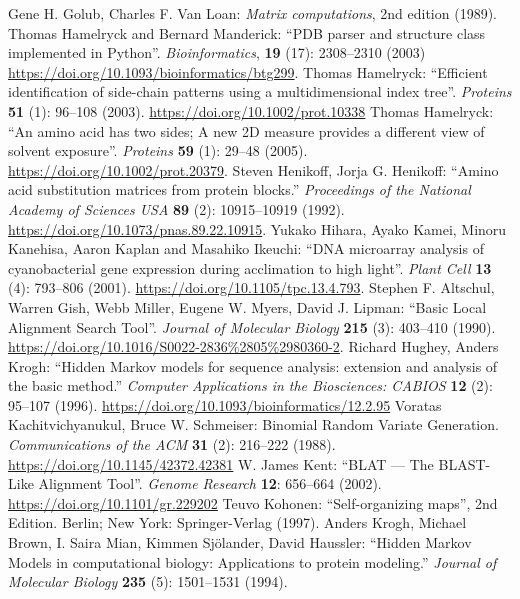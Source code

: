 \documentclass{report}
\begin{document}
\begin{thebibliography}{99}
Gene H. Golub, Charles F. Van Loan: \textit{Matrix computations}, 2nd edition (1989).
Thomas Hamelryck and  Bernard Manderick: ``PDB parser and structure class
implemented in Python''. \textit{Bioinformatics}, \textbf{19} (17): 2308--2310 (2003) \url{https://doi.org/10.1093/bioinformatics/btg299}. 
Thomas Hamelryck: ``Efficient identification of side-chain patterns using a multidimensional index tree''. \textit{Proteins} {\bf 51} (1): 96--108 (2003).
\url{https://doi.org/10.1002/prot.10338}
Thomas Hamelryck: ``An amino acid has two sides; A new 2D measure provides a different view of solvent exposure''. \textit{Proteins} {\bf 59} (1): 29--48 (2005).
\url{https://doi.org/10.1002/prot.20379}.
Steven Henikoff, Jorja G. Henikoff: ``Amino acid substitution matrices from protein blocks.'' \textit{Proceedings of the National Academy of Sciences USA} {\bf 89} (2): 10915--10919 (1992). \url{https://doi.org/10.1073/pnas.89.22.10915}.
Yukako Hihara, Ayako Kamei, Minoru Kanehisa, Aaron Kaplan and Masahiko Ikeuchi: ``DNA microarray analysis of cyanobacterial gene expression during acclimation to high light''. \textit{Plant Cell} {\bf 13} (4): 793--806 (2001). \url{https://doi.org/10.1105/tpc.13.4.793}.
Stephen F. Altschul, Warren Gish, Webb Miller, Eugene W. Myers, David J. Lipman: ``Basic Local Alignment Search Tool''.  \textit{Journal of Molecular Biology} {\bf 215} (3): 403--410 (1990). \url{https://doi.org/10.1016/S0022-2836%2805%2980360-2}.
Richard Hughey, Anders Krogh: ``Hidden Markov models for sequence analysis: extension and analysis of the basic method.''  \textit{Computer Applications in the Biosciences: CABIOS} {\bf 12} (2): 95--107 (1996).
\url{https://doi.org/10.1093/bioinformatics/12.2.95}
Voratas Kachitvichyanukul, Bruce W. Schmeiser: Binomial Random Variate Generation. \textit{Communications of the ACM} {\bf 31} (2): 216--222 (1988). \url{https://doi.org/10.1145/42372.42381}
W. James Kent: ``BLAT --- The BLAST-Like Alignment Tool''. \textit{Genome Research} {\bf 12}: 656--664 (2002). \url{https://doi.org/10.1101/gr.229202}
Teuvo Kohonen: ``Self-organizing maps'', 2nd Edition. Berlin; New York: Springer-Verlag (1997).
Anders Krogh, Michael Brown, I. Saira Mian, Kimmen Sj\"olander, David Haussler:
``Hidden Markov Models in computational biology: Applications to protein modeling.'' \textit{Journal of Molecular Biology} {\bf 235} (5): 1501--1531 (1994).

\end{thebibliography}
\end{document}
